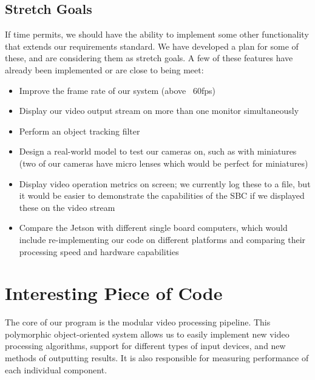 \documentclass[letterpaper,10pt,titlepage]{IEEEtran}
\begin{document}
	\subsection{Stretch Goals}
	If time permits, we should have the ability to implement some other functionality that extends our requirements standard. We have developed a plan for some of these, and are considering them as stretch goals. A few of these features have already been implemented or are close to being meet:\\
	\begin{itemize}
		\item Improve the frame rate of our system (above ~60fps)
		\item Display our video output stream on more than one monitor simultaneously  
		\item Perform an object tracking filter
		\item Design a real-world model to test our cameras on, such as with miniatures (two of our cameras have micro lenses which would be perfect for miniatures)
		\item Display video operation metrics on screen; we currently log these to a file, but it would be easier to demonstrate the capabilities of the SBC if we displayed these on the video stream
		\item Compare the Jetson with different single board computers, which would include re-implementing our code on different platforms and comparing their processing speed and hardware capabilities\\
	\end{itemize}
	
   \section{Interesting Piece of Code}
   The core of our program is the modular video processing pipeline. This polymorphic object-oriented system allows us to easily implement new video processing algorithms, support for different types of input devices, and new methods of outputting results. It is also responsible for measuring performance of each individual component.\\
\end{document}
